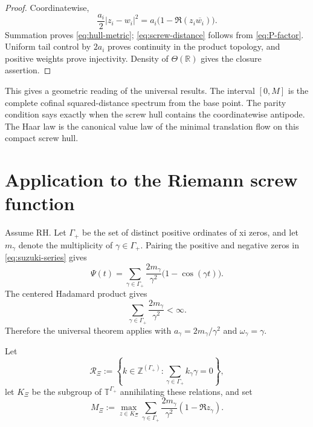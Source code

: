 \documentclass[11pt]{article}
\theoremstyle{remark}
\newcommand{\T}{\mathbb T}
\newcommand{\R}{\mathbb R}
\newcommand{\Z}{\mathbb Z}
\newcommand{\Rel}{\mathcal R}
\begin{document}
\begin{proof}
Coordinatewise,
\[
 \frac{a_i}{2}|z_i-w_i|^2
 =a_i\bigl(1-\Re(z_i\overline{w_i})\bigr).
\]
Summation proves \eqref{eq:hull-metric}; \eqref{eq:screw-distance} follows from
\eqref{eq:P-factor}.  Uniform tail control by $2a_i$ proves continuity in the product topology, and
positive weights prove injectivity.  Density of $\Theta(\R)$ gives the closure assertion.
\end{proof}

This gives a geometric reading of the universal results.  The interval $[0,M]$ is the complete
cofinal squared-distance spectrum from the base point.  The parity condition says exactly when the
screw hull contains the coordinatewise antipode.  The Haar law is the canonical value law of the
minimal translation flow on this compact screw hull.

\section{Application to the Riemann screw function}\label{sec:xi}

Assume RH.  Let $\Gamma_+$ be the set of distinct positive ordinates of xi zeros, and let
$m_\gamma$ denote the multiplicity of $\gamma\in\Gamma_+$.  Pairing the positive and negative
zeros in \eqref{eq:suzuki-series} gives
\begin{equation}\label{eq:Psi-positive}
 \Psi(t)=\sum_{\gamma\in\Gamma_+}
  \frac{2m_\gamma}{\gamma^2}\bigl(1-\cos(\gamma t)\bigr).
\end{equation}
The centered Hadamard product gives
\begin{equation}\label{eq:zero-summability}
 \sum_{\gamma\in\Gamma_+}\frac{2m_\gamma}{\gamma^2}<\infty.
\end{equation}
Therefore the universal theorem applies with
$a_\gamma=2m_\gamma/\gamma^2$ and $\omega_\gamma=\gamma$.

Let
\begin{equation}\label{eq:Xi-relations}
 \Rel_\Xi:=\left\{k\in\Z^{(\Gamma_+)}:
        \sum_{\gamma\in\Gamma_+}k_\gamma\gamma=0\right\},
\end{equation}
let $K_\Xi$ be the subgroup of $\T^{\Gamma_+}$ annihilating these relations, and set
\begin{equation}\label{eq:M-Xi}
 M_\Xi:=\max_{z\in K_\Xi}
 \sum_{\gamma\in\Gamma_+}\frac{2m_\gamma}{\gamma^2}(1-\Re z_\gamma).
\end{equation}
\end{document}
